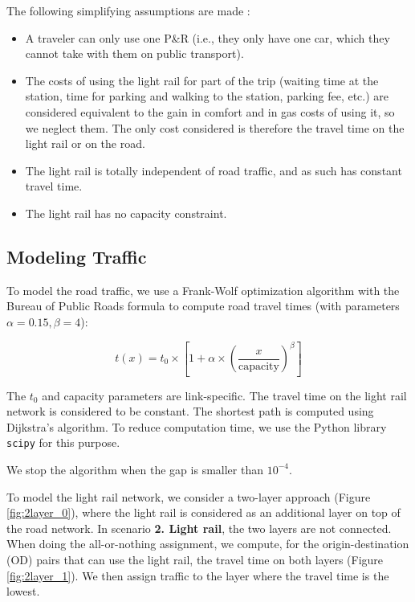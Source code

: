The following simplifying assumptions are made :
\begin{itemize}
    \item A traveler can only use one P\&R (i.e., they only have one car, which they cannot take with them on public transport).
    \item The costs of using the light rail for part of the trip (waiting time at the station, time for parking and walking to the station, parking fee, etc.) are considered equivalent to the gain in comfort and in gas costs of using it, so we neglect them. The only cost considered is therefore the travel time on the light rail or on the road.
    \item The light rail is totally independent of road traffic, and as such has constant travel time.
    \item The light rail has no capacity constraint.
\end{itemize}


\subsection{Modeling Traffic}

To model the road traffic, we use a Frank-Wolf optimization algorithm with the Bureau of Public Roads formula to compute road travel times (with parameters $\alpha = 0.15, \beta = 4$): 

\begin{equation}
    t(x) = t_0 \times \left [ 1 + \alpha \times \left (\frac{x}{\text{capacity}} \right )^\beta \right ]
\end{equation}

The $t_0$ and capacity parameters are link-specific. The travel time on the light rail network is considered to be constant. The shortest path is computed using Dijkstra's algorithm. To reduce computation time, we use the Python library \texttt{scipy} for this purpose.

We stop the algorithm when the gap is smaller than $10^{-4}$.

To model the light rail network, we consider a two-layer approach (Figure \ref{fig:2layer_0}), where the light rail is considered as an additional layer on top of the road network. In scenario \textbf{2. Light rail}, the two layers are not connected. When doing the all-or-nothing assignment, we compute, for the origin-destination (OD) pairs that can use the light rail, the travel time on both layers (Figure \ref{fig:2layer_1}). We then assign traffic to the layer where the travel time is the lowest.

